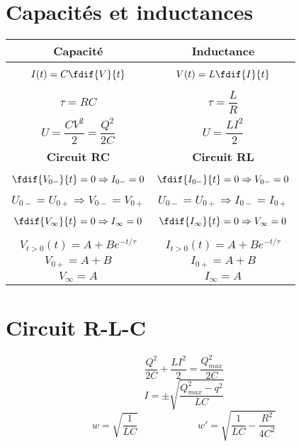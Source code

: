 \section{Capacités et inductances}
\begin{table}[H]
  \begin{center}
    \begin{tabular}{|m{6.5cm}|m{6.5cm}|}
      \hline
      \multicolumn{1}{|c|}{\textbf{Capacité}} &
      \multicolumn{1}{c|}{\textbf{Inductance}}\\
      \hline
      \[ I(t) = C\fdif{V}{t} \] & \[ V(t) = L\fdif{I}{t} \]\\
      \[ \tau = RC \] & \[ \tau = \frac{L}{R} \]\\
      \[ U = \frac{CV^2}{2} = \frac{Q^2}{2C} \] & \[ U = \frac{LI^2}{2} \]\\
      \hline
      \multicolumn{1}{|c|}{\textbf{Circuit RC}} &
      \multicolumn{1}{c|}{\textbf{Circuit RL}}\\
      \hline
      \[ \fdif{V_{0-}}{t} = 0 \Rightarrow I_{0-} = 0 \]
      & \[ \fdif{I_{0-}}{t} = 0 \Rightarrow V_{0-} = 0 \]\\
      \[ U_{0-} = U_{0+} \Rightarrow V_{0-} = V_{0+} \]
      & \[ U_{0-} = U_{0+} \Rightarrow I_{0-} = I_{0+} \]\\
      \[ \fdif{V_{\infty}}{t} = 0 \Rightarrow I_{\infty} = 0 \]
      & \[ \fdif{I_{\infty}}{t} = 0 \Rightarrow V_{\infty} = 0 \]\\
      \[ V_{t>0}(t) = A + Be^{-t/\tau} \]
      & \[ I_{t>0}(t) = A + Be^{-t/\tau} \]\\
      \[ V_{0+} = A + B \] & \[ I_{0+} = A + B \]\\
      \[ V_{\infty} = A \] & \[ I_{\infty} = A \]\\
      \hline
    \end{tabular}
  \end{center}
\end{table}

\section{Circuit R-L-C}
\[ \frac{Q^2}{2C} + \frac{LI^2}{2} = \frac{Q^{2}_{max}}{2C} \]
\[ I = \pm \sqrt{\frac{Q^{2}_{max} - q^2}{LC}} \]
\[ w = \sqrt{\frac{1}{LC}}\qquad{\qquad{\qquad}}w' = \sqrt{\frac{1}{LC}
- \frac{R^2}{4C^{2}}} \]

